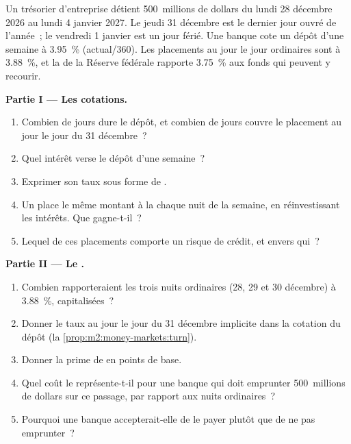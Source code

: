 \begin{problem}\label{pb:m2:money-markets:1}
Un trésorier d'entreprise détient 500~millions de dollars du lundi 28 décembre 2026 au
lundi 4 janvier 2027. Le jeudi 31 décembre est le dernier jour ouvré
de l'année~; le vendredi 1 janvier est un jour férié. Une banque cote un dépôt d'une semaine à
3.95~\% (actual/360). Les placements au jour le jour ordinaires sont à 3.88~\%, et la
 de la Réserve fédérale rapporte 3.75~\% aux fonds qui peuvent
y recourir.

\medskip\noindent\textbf{Partie I --- Les cotations.}
\begin{enumerate}
\item Combien de jours dure le dépôt, et combien de jours couvre le placement
au jour le jour du 31 décembre~?
\item Quel intérêt verse le dépôt d'une semaine~?
\item Exprimer son taux sous forme de .
\item Un  place le même montant à la  chaque
nuit de la semaine, en réinvestissant les intérêts. Que gagne-t-il~?
\item Lequel de ces placements comporte un risque de crédit, et envers qui~?
\end{enumerate}

\medskip\noindent\textbf{Partie II --- Le .}
\begin{enumerate}[resume]
\item Combien rapporteraient les trois nuits ordinaires (28, 29 et 30 décembre) à
3.88~\%, capitalisées~?
\item Donner le taux au jour le jour du 31 décembre implicite dans la cotation
du dépôt (la \cref{prop:m2:money-markets:turn}).
\item Donner la prime de  en points de base.
\item Quel coût le  représente-t-il pour une banque qui doit emprunter
500~millions de dollars sur ce passage, par rapport aux nuits ordinaires~?
\item Pourquoi une banque accepterait-elle de le payer plutôt que de ne pas emprunter~?
\end{enumerate}


\end{problem}
